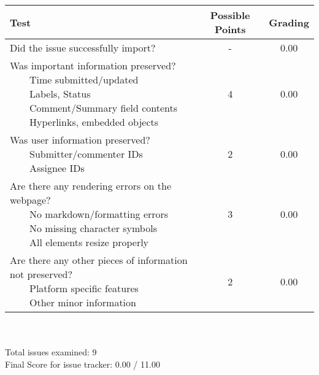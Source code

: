 \documentclass{article}
\newcommand{\tabitem}{~~\llap{\textbullet}~~}
\begin{document}
\begin{adjustbox}{center}
	\renewcommand{\arraystretch}{1.5}
	\begin{tabular}{ p{6cm} | c | c }
		Test & Possible Points & Grading \\ \hline
		Did the issue successfully import? & - & 0.00 \\
		\hline
		\makecell[l]{
			Was important information preserved? \\
			\tabitem Time submitted/updated \\
			\tabitem Labels, Status \\
			\tabitem Comment/Summary field contents \\
			\tabitem Hyperlinks, embedded objects}
		& 4 & 0.00 \\
		\hline
		\makecell[l]{
			Was user information preserved? \\
			\tabitem Submitter/commenter IDs \\
			\tabitem Assignee IDs
		} & 2 & 0.00 \\
		\hline
		\makecell[{{p{6cm}}}]{
			Are there any rendering errors on the webpage? \\
			\tabitem No markdown/formatting errors \\
			\tabitem No missing character symbols \\
			\tabitem All elements resize properly
		} & 3 & 0.00 \\
		\hline
		\makecell[{{p{6cm}}}]{
			Are there any other pieces of information not preserved? \\
			\tabitem Platform specific features \\
			\tabitem Other minor information
		} & 2 & 0.00 \\
	\end{tabular}
\end{adjustbox}
\\
\\Total issues examined: 9\\Final Score for issue tracker: 0.00 / 11.00 \\ \\\begin{adjustbox}{center}
\end{adjustbox}
\\
\end{document}
